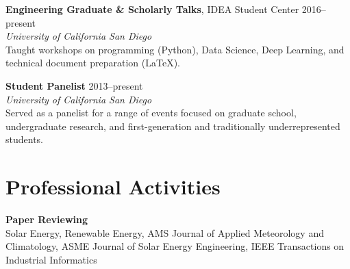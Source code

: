\documentclass[]{res}
\begin{document}
\begin{resume}
\textbf{Engineering Graduate \& Scholarly Talks}, IDEA Student Center \hfill 2016--present \\
\textit{University of California San Diego} \\
Taught workshops on programming (Python), Data Science, Deep Learning, and
technical document preparation (LaTeX).

\textbf{Student Panelist} \hfill 2013--present \\
\textit{University of California San Diego} \\
Served as a panelist for a range of events focused on graduate school,
undergraduate research, and first-generation and traditionally underrepresented
students.


\section{Professional Activities}
\vspace{0.1in}

\textbf{Paper Reviewing} \\
Solar Energy, Renewable Energy, AMS Journal of Applied Meteorology and
Climatology, ASME Journal of Solar Energy Engineering, IEEE Transactions on
Industrial Informatics


%
%
%
%
%



\end{resume}
\end{document}
